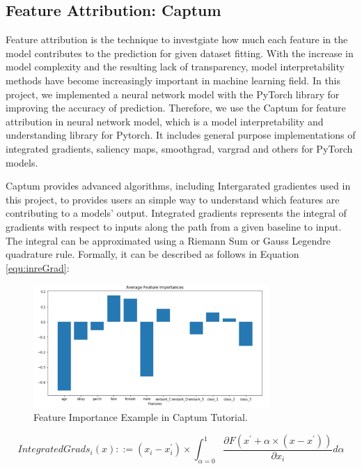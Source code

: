 \documentclass[final-report]{report-template}
\begin{document}
\subsection{Feature Attribution: Captum}
Feature attribution is the technique to investgiate how much each feature in the model contributes to the prediction for given dataset fitting. 
With the increase in model complexity and the resulting lack of transparency, model interpretability methods have become increasingly important in machine learning field.
In this project, we implemented a neural network model with the PyTorch library \citep{PyTorch} for improving the accuracy of prediction. Therefore, we use the Captum for feature attribution in neural network model, which is a model interpretability and understanding library for Pytorch.
It includes general purpose implementations of integrated gradients, saliency maps, smoothgrad, vargrad and others for PyTorch models.

Captum provides advanced algorithms, including Intergarated gradientes used in this project, to provides users an simple way to understand which features are contributing to a models' output.
Integrated gradients represents the integral of gradients with respect to inputs along the path from a given baseline to input. The integral can be approximated using a Riemann Sum or Gauss Legendre quadrature rule. Formally, it can be described as follows in Equation \eqref{equ:inreGrad}:

\begin{figure}
    \begin{center}
        \includegraphics[width=0.8\textwidth]{feature_importance.png}
    \end{center}
    \caption{\label{fig:feature_importance} Feature Importance Example in Captum Tutorial.}
\end{figure}

\begin{equation}
    IntegratedGrads_{i}(x) ::= (x_{i} - x_{i}^{'}) \times 	\int_{\alpha=0}^1 \frac{\partial F(x^{'}+\alpha \times (x-x^{'}))}{\partial x_{i}} d\alpha  \label{equ:inreGrad}    
\end{equation}
\end{document}
